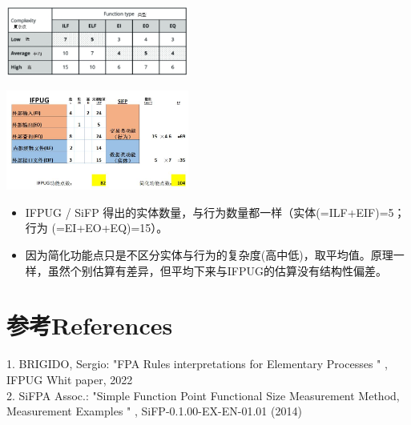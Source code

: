 
\includegraphics[width=6cm]{微信截图_20230703095053-2.jpg}


\includegraphics[width=6cm]{FPA_S11.jpg}

\begin{itemize}
\tightlist
\item
  IFPUG / SiFP 得出的实体数量，与行为数量都一样（实体(=ILF+EIF)=5；行为
  (=EI+EO+EQ)=15）。
\item
  因为简化功能点只是不区分实体与行为的复杂度(高中低)，取平均值。原理一样，虽然个别估算有差异，但平均下来与IFPUG的估算没有结构性偏差。
\end{itemize}

\hypertarget{ux53c2ux8003references}{%
\section{参考References}\label{ux53c2ux8003references}}

1. BRIGIDO, Sergio: "FPA Rules interpretations for Elementary Processes
" , IFPUG Whit paper, 2022\\
2. SiFPA Assoc.: "Simple Function Point Functional Size Measurement
Method, Measurement Examples " , SiFP-0.1.00-EX-EN-01.01 (2014)\\


